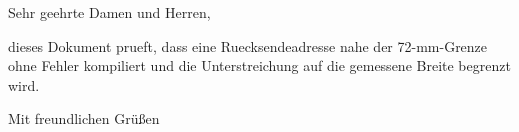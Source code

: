 \documentclass[lang=german]{../../onlinebrief24}
\begin{document}
\begin{letter}{}
\opening{Sehr geehrte Damen und Herren,}

dieses Dokument prueft, dass eine Ruecksendeadresse nahe der 72-mm-Grenze ohne
Fehler kompiliert und die Unterstreichung auf die gemessene Breite begrenzt wird.

\closing{Mit freundlichen Gr\"u\ss{}en}
\end{letter}
\end{document}
